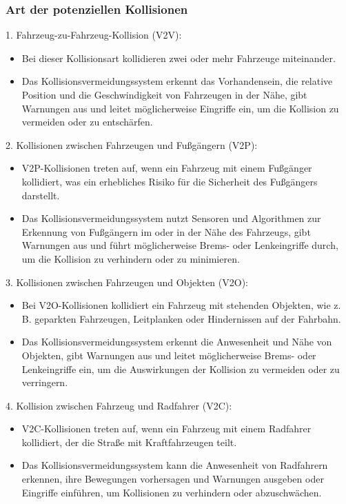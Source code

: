 \subsubsection{Art der potenziellen Kollisionen}
1. Fahrzeug-zu-Fahrzeug-Kollision (V2V):
\begin{itemize}
	\item Bei dieser Kollisionsart kollidieren zwei oder mehr Fahrzeuge miteinander.
	\item Das Kollisionsvermeidungssystem erkennt das Vorhandensein, die relative Position und die Geschwindigkeit von Fahrzeugen in der Nähe, gibt Warnungen aus und leitet möglicherweise Eingriffe ein, um die Kollision zu vermeiden oder zu entschärfen.
\end{itemize}
2. Kollisionen zwischen Fahrzeugen und Fußgängern (V2P):
\begin{itemize}
	\item V2P-Kollisionen treten auf, wenn ein Fahrzeug mit einem Fußgänger kollidiert, was ein erhebliches Risiko für die Sicherheit des Fußgängers darstellt.
	\item Das Kollisionsvermeidungssystem nutzt Sensoren und Algorithmen zur Erkennung von Fußgängern im oder in der Nähe des Fahrzeugs, gibt Warnungen aus und führt möglicherweise Brems- oder Lenkeingriffe durch, um die Kollision zu verhindern oder zu minimieren.
\end{itemize}
3. Kollisionen zwischen Fahrzeugen und Objekten (V2O):
\begin{itemize}
	\item Bei V2O-Kollisionen kollidiert ein Fahrzeug mit stehenden Objekten, wie z. B. geparkten Fahrzeugen, Leitplanken oder Hindernissen auf der Fahrbahn.
	\item Das Kollisionsvermeidungssystem erkennt die Anwesenheit und Nähe von Objekten, gibt Warnungen aus und leitet möglicherweise Brems- oder Lenkeingriffe ein, um die Auswirkungen der Kollision zu vermeiden oder zu verringern.
\end{itemize}
4. Kollision zwischen Fahrzeug und Radfahrer (V2C):
\begin{itemize}
	\item V2C-Kollisionen treten auf, wenn ein Fahrzeug mit einem Radfahrer kollidiert, der die Straße mit Kraftfahrzeugen teilt.
	\item Das Kollisionsvermeidungssystem kann die Anwesenheit von Radfahrern erkennen, ihre Bewegungen vorhersagen und Warnungen ausgeben oder Eingriffe einführen, um Kollisionen zu verhindern oder abzuschwächen.
\end{itemize}
